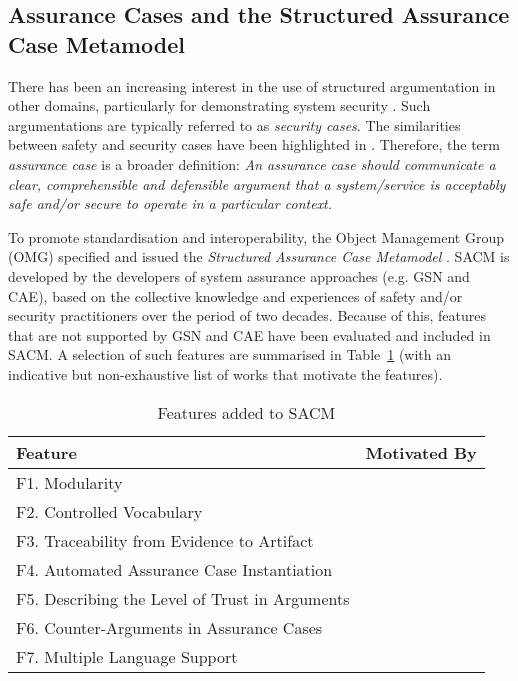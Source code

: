 \subsection{Assurance Cases and the Structured Assurance Case Metamodel}
There has been an increasing interest in the use of structured argumentation in other domains, particularly for demonstrating system security \cite{bloomfield2010safety}. 
Such argumentations are typically referred to as \textit{security cases}. 
The similarities between safety and security cases have been highlighted in \cite{lautieri2005safsec}. 
Therefore, the term \textit{assurance case} is a broader definition: \textit{An assurance case should communicate a clear, comprehensible and defensible argument that a system/service is acceptably safe and/or secure to operate in a particular context.} 

To promote standardisation and interoperability, the Object Management Group (OMG) specified and issued the \textit{Structured Assurance Case Metamodel} \cite{sacm}. 
SACM is developed by the developers of system assurance approaches (e.g. GSN and CAE), based on the collective knowledge and experiences of safety and/or security practitioners over the period of two decades. 
Because of this, features that are not supported by GSN and CAE have been evaluated and included in SACM. 
A selection of such features are summarised in Table~\ref{tab:feature} (with an indicative but non-exhaustive list of works that motivate the features).

\begin{table}[]
	\centering
	\begin{tabular}{|l|l|}
		\hline
		\textbf{Feature}               & \multicolumn{1}{c|}{\textbf{Motivated By}}                        \\ \hline
		F1. Modularity            & \multicolumn{1}{c|}{\cite{despotou2008investigating}} \\ \hline
		F2. Controlled Vocabulary &\multicolumn{1}{c|}{\cite{luo2015safety, attwood2014use}}                  \\ \hline
		F3. Traceability from Evidence to Artifact &\multicolumn{1}{c|}{\cite{taguchi2014linking}}                  \\ \hline
		F4. Automated Assurance Case Instantiation &\multicolumn{1}{c|}{\cite{hawkins2015need, hawkins2015weaving}}                  \\ \hline
		F5. Describing the Level of Trust in Arguments &\multicolumn{1}{c|}{\cite{fenn2005putting}}                  \\ \hline
		F6. Counter-Arguments in Assurance Cases &\multicolumn{1}{c|}{\cite{armstrong2004deconstruction}}                  \\ \hline
		F7. Multiple Language Support &\multicolumn{1}{c|}{\cite{denney2013formal}}                  \\ \hline
	\end{tabular}
	\caption{Features added to SACM}
	\label{tab:feature}
\end{table}

